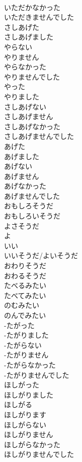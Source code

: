 \documentclass[8pt]{extreport}
\begin{document}
\begin{CJK}{UTF8}{min}
\\	いただかなかった 
\\	いただきませんでした	
\\	さしあげた 
\\	さしあげました	
\\	やらない 
\\	やりません	
\\	やらなかった 
\\	やりませんでした	
\\	やった 
\\	やりました	
\\	さしあげない 
\\	さしあげません	
\\	さしあげなかった 
\\	さしあげませんでした	
\\	あげた 
\\	あげました	
\\	あげない 
\\	あげません	
\\	あげなかった 
\\	あげませんでした	
\\	おもしろそうだ		
\\	おもしろいそうだ		
\\	よさそうだ 
\\	よ 
\\	いい 
\\	いいそうだ/よいそうだ		
\\	おわりそうだ		
\\	おわるそうだ		
\\	たべるみたい		
\\	たべてみたい		
\\	のむみたい		
\\	のんでみたい		
\\	-たがった 
\\	-たがりました		
\\	-たがらない 
\\	-たがりません		
\\	-たがらなかった 
\\	-たがりませんでした		
\\	ほしがった 
\\	ほしがりました		
\\	ほしがる 
\\	ほしがります		
\\	ほしがらない 
\\	ほしがりません		
\\	ほしがらなかった 
\\	ほしがりませんでした		

\end{CJK}
\end{document}
